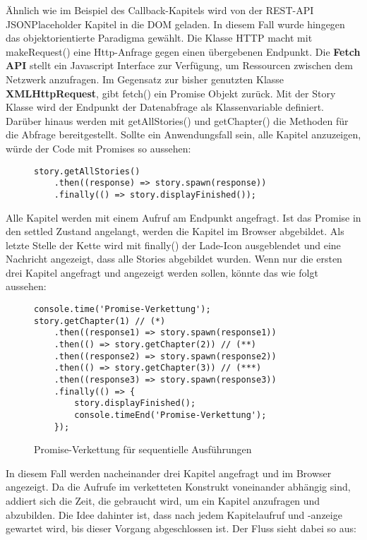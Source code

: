 \noindent
Ähnlich wie im Beispiel des Callback-Kapitels wird von der REST-API JSONPlaceholder Kapitel in die DOM geladen. In diesem Fall wurde hingegen das objektorientierte Paradigma gewählt. Die Klasse HTTP macht mit makeRequest() eine Http-Anfrage gegen einen übergebenen Endpunkt. Die \textbf{Fetch API} stellt ein Javascript Interface zur Verfügung, um Ressourcen zwischen dem Netzwerk anzufragen. Im Gegensatz zur bisher genutzten Klasse \textbf{XMLHttpRequest}, gibt fetch() ein Promise Objekt zurück. Mit der Story Klasse wird der Endpunkt der Datenabfrage als Klassenvariable definiert. Darüber hinaus werden mit getAllStories() und getChapter() die Methoden für die Abfrage bereitgestellt. Sollte ein Anwendungsfall sein, alle Kapitel anzuzeigen, würde der Code mit Promises so aussehen:

\begin{figure}[H]
\begin{lstlisting}[basicstyle=\small]
story.getAllStories()
    .then((response) => story.spawn(response))
    .finally(() => story.displayFinished());
\end{lstlisting}
\end{figure}

\noindent
Alle Kapitel werden mit einem Aufruf am Endpunkt angefragt. Ist das Promise in den settled Zustand angelangt, werden die Kapitel im Browser abgebildet. Als letzte Stelle der Kette wird mit finally() der Lade-Icon ausgeblendet und eine Nachricht angezeigt, dass alle Stories abgebildet wurden. Wenn nur die ersten drei Kapitel angefragt und angezeigt werden sollen, könnte das wie folgt aussehen: 

\begin{figure}[H]
\begin{lstlisting}[basicstyle=\small]
console.time('Promise-Verkettung');
story.getChapter(1) // (*)
    .then((response1) => story.spawn(response1))
    .then(() => story.getChapter(2)) // (**)
    .then((response2) => story.spawn(response2))
    .then(() => story.getChapter(3)) // (***)
    .then((response3) => story.spawn(response3))
    .finally(() => {
        story.displayFinished();
        console.timeEnd('Promise-Verkettung');
    });
\end{lstlisting}
\caption{Promise-Verkettung für sequentielle Ausführungen}
\label{Promises-sequential-calls}
\end{figure}

\noindent
In diesem Fall werden nacheinander drei Kapitel angefragt und im Browser angezeigt. Da die Aufrufe im verketteten Konstrukt voneinander abhängig sind, addiert sich die Zeit, die gebraucht wird, um ein Kapitel anzufragen und abzubilden. Die Idee dahinter ist, dass nach jedem Kapitelaufruf und -anzeige gewartet wird, bis dieser Vorgang abgeschlossen ist. Der Fluss sieht dabei so aus:

